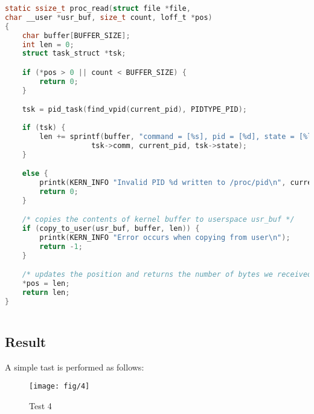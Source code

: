 \documentclass{article}
\begin{document}
\begin{lstlisting}[language=c, caption={proc\_write()}, captionpos=b]
static ssize_t proc_read(struct file *file, 
char __user *usr_buf, size_t count, loff_t *pos)
{
    char buffer[BUFFER_SIZE];
    int len = 0;
    struct task_struct *tsk;

    if (*pos > 0 || count < BUFFER_SIZE) {
        return 0;
    }

    tsk = pid_task(find_vpid(current_pid), PIDTYPE_PID);
    
    if (tsk) {
        len += sprintf(buffer, "command = [%s], pid = [%d], state = [%ld]\n",
                    tsk->comm, current_pid, tsk->state);
    }

    else {
        printk(KERN_INFO "Invalid PID %d written to /proc/pid\n", current_pid);
        return 0;
    }

    /* copies the contents of kernel buffer to userspace usr_buf */ 
    if (copy_to_user(usr_buf, buffer, len)) {
        printk(KERN_INFO "Error occurs when copying from user\n");
        return -1;
    }

    /* updates the position and returns the number of bytes we received */
    *pos = len;
    return len;
}
    
\end{lstlisting}

\subsection*{Result}
A simple tast is performed as follows:

\begin{figure}[h]
    \centering
    
    \texttt{[image: fig/4]}
    \caption{Test 4}
    \label{4}
\end{figure}
\end{document}

